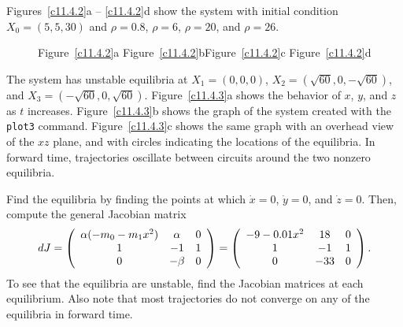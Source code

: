 \documentclass{ximera}
\begin{document}
\para Figures~\ref{c11.4.2}a -- \ref{c11.4.2}d show the system with
initial condition $X_0 = (5,5,30)$ and $\rho = 0.8$, $\rho = 6$, $\rho = 20$,
and $\rho = 26$.

\begin{figure}[htb]
                       \centerline{%
                       }
		\centerline{Figure~\ref{c11.4.2}a\hspace{0.8in}
        	Figure~\ref{c11.4.2}b\hspace{0.8in}Figure~\ref{c11.4.2}c
        	\hspace{0.8in}Figure~\ref{c11.4.2}d}
\end{figure}


\ans The system has unstable equilibria at $X_1 = (0,0,0)$,
$X_2 = (\sqrt{60},0, -\sqrt{60})$, and $X_3 = (-\sqrt{60},0,\sqrt{60})$.
Figure~\ref{c11.4.3}a shows the behavior of $x$, $y$, and $z$ as $t$
increases.  Figure~\ref{c11.4.3}b shows the graph of the system created
with the {\tt plot3} command.  Figure~\ref{c11.4.3}c shows the same graph
with an overhead view of the $xz$ plane, and with circles indicating the
locations of the equilibria.  In forward time, trajectories oscillate
between circuits around the two nonzero equilibria.

\soln Find the equilibria by finding the points at which $\dot{x} = 0$,
$\dot{y} = 0$, and $\dot{z} = 0$.  Then, compute the general Jacobian
matrix
\[
dJ = \left(\begin{array}{ccc} \alpha(-m_0 - m_1x^2) & \alpha & 0 \\ 1 & -1 & 1 \\ 0 & -\beta & 0\end{array}\right)
= \left(\begin{array}{ccc} -9 - 0.01x^2 & 18 & 0 \\ 1 & -1 & 1 \\ 0 & -33 & 0\end{array}\right).
\]
To see that the equilibria are unstable, find the Jacobian matrices at
each equilibrium.  Also note that most trajectories do not converge on
any of the equilibria in forward time.

\begin{figure}[htb]
                       \centerline{%
			\hspace{0.5in}
			\hspace{0.3in}
                       }
\end{figure}
\end{document}
